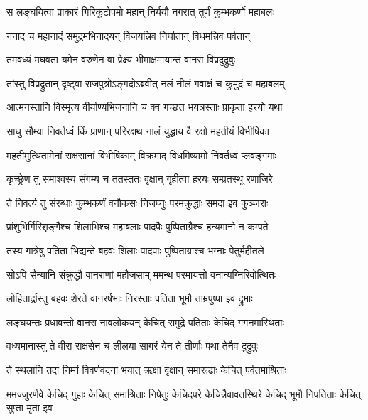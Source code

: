 
\twolineshloka
{स लङ्घयित्वा प्राकारं गिरिकूटोपमो महान्}
{निर्ययौ नगरात् तूर्णं कुम्भकर्णो महाबलः} %

\twolineshloka
{ननाद च महानादं समुद्रमभिनादयन्}
{विजयन्निव निर्घातान् विधमन्निव पर्वतान्} %

\twolineshloka
{तमवध्यं मघवता यमेन वरुणेन वा}
{प्रेक्ष्य भीमाक्षमायान्तं वानरा विप्रदुद्रुवुः} %

\twolineshloka
{तांस्तु विप्रद्रुतान् दृष्ट्वा राजपुत्रोऽङ्गदोऽब्रवीत्}
{नलं नीलं गवाक्षं च कुमुदं च महाबलम्} %

\twolineshloka
{आत्मनस्तानि विस्मृत्य वीर्याण्यभिजनानि च}
{क्व गच्छत भयत्रस्ताः प्राकृता हरयो यथा} %

\twolineshloka
{साधु सौम्या निवर्तध्वं किं प्राणान् परिरक्षथ}
{नालं युद्धाय वै रक्षो महतीयं विभीषिका} %

\twolineshloka
{महतीमुत्थितामेनां राक्षसानां विभीषिकाम्}
{विक्रमाद् विधमिष्यामो निवर्तध्वं प्लवङ्गमाः} %

\twolineshloka
{कृच्छ्रेण तु समाश्वस्य संगम्य च ततस्ततः}
{वृक्षान् गृहीत्वा हरयः सम्प्रतस्थू रणाजिरे} %

\twolineshloka
{ते निवर्त्य तु संरब्धाः कुम्भकर्णं वनौकसः}
{निजघ्नुः परमक्रुद्धाः समदा इव कुञ्जराः} %

\twolineshloka
{प्रांशुभिर्गिरिशृङ्गैश्च शिलाभिश्च महाबलाः}
{पादपैः पुष्पिताग्रैश्च हन्यमानो न कम्पते} %

\twolineshloka
{तस्य गात्रेषु पतिता भिद्यन्ते बहवः शिलाः}
{पादपाः पुष्पिताग्राश्च भग्नाः पेतुर्महीतले} %

\twolineshloka
{सोऽपि सैन्यानि संक्रुद्धौ वानराणां महौजसाम्}
{ममन्थ परमायत्तो वनान्यग्निरिवोत्थितः} %

\twolineshloka
{लोहितार्द्रास्तु बहवः शेरते वानरर्षभाः}
{निरस्ताः पतिता भूमौ ताम्रपुष्पा इव द्रुमाः} %

\twolineshloka
{लङ्घयन्तः प्रधावन्तो वानरा नावलोकयन्}
{केचित् समुद्रे पतिताः केचिद् गगनमास्थिताः} %

\twolineshloka
{वध्यमानास्तु ते वीरा राक्षसेन च लीलया}
{सागरं येन ते तीर्णाः पथा तेनैव दुद्रुवुः} %

\twolineshloka
{ते स्थलानि तदा निम्नं विवर्णवदना भयात्}
{ऋक्षा वृक्षान् समारूढाः केचित् पर्वतमाश्रिताः} %

\threelineshloka
{ममज्जुरर्णवे केचिद् गुहाः केचित् समाश्रिताः}
{निपेतुः केचिदपरे केचिन्नैवावतस्थिरे}
{केचिद् भूमौ निपतिताः केचित् सुप्ता मृता इव} %

